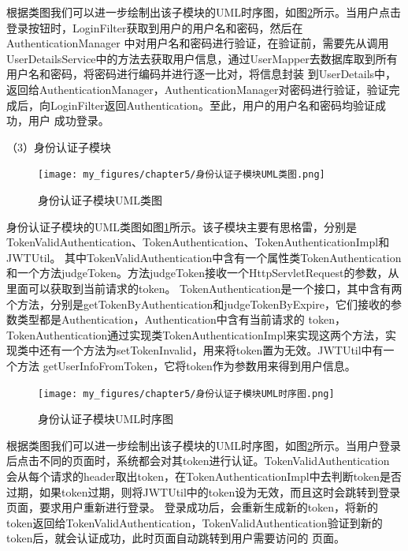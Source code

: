 根据类图我们可以进一步绘制出该子模块的UML时序图，如图\ref{fig:身份认证子模块UML时序图}所示。当用户点击登录按钮时，LoginFilter获取到用户的用户名和密码，然后在AuthenticationManager
中对用户名和密码进行验证，在验证前，需要先从调用UserDetailsService中的方法去获取用户信息，通过UserMapper去数据库取到所有用户名和密码，将密码进行编码并进行逐一比对，将信息封装
到UserDetails中，返回给AuthenticationManager，AuthenticationManager对密码进行验证，验证完成后，向LoginFilter返回Authentication。至此，用户的用户名和密码均验证成功，用户
成功登录。




（3）身份认证子模块

\begin{figure}[htb]
    \centering
    \texttt{[image: my\_figures/chapter5/身份认证子模块UML类图.png]}
    \caption{身份认证子模块UML类图}
    \label{fig:身份认证子模块UML类图}
\end{figure}

身份认证子模块的UML类图如图\ref{fig:身份认证子模块UML类图}所示。该子模块主要有思格雷，分别是TokenValidAuthentication、TokenAuthentication、TokenAuthenticationImpl和JWTUtil。
其中TokenValidAuthentication中含有一个属性类TokenAuthentication和一个方法judgeToken。方法judgeToken接收一个HttpServletRequest的参数，从里面可以获取到当前请求的token。
TokenAuthentication是一个接口，其中含有两个方法，分别是getTokenByAuthentication和judgeTokenByExpire，它们接收的参数类型都是Authentication，Authentication中含有当前请求的
token，TokenAuthentication通过实现类TokenAuthenticationImpl来实现这两个方法，实现类中还有一个方法为setTokenInvalid，用来将token置为无效。JWTUtil中有一个方法
getUserInfoFromToken，它将token作为参数用来得到用户信息。

\begin{figure}[htb]
    \centering
    \texttt{[image: my\_figures/chapter5/身份认证子模块UML时序图.png]}
    \caption{身份认证子模块UML时序图}
    \label{fig:身份认证子模块UML时序图}
\end{figure}

根据类图我们可以进一步绘制出该子模块的UML时序图，如图\ref{fig:身份认证子模块UML时序图}所示。当用户登录后点击不同的页面时，系统都会对其token进行认证。TokenValidAuthentication
会从每个请求的header取出token，在TokenAuthenticationImpl中去判断token是否过期，如果token过期，则将JWTUtil中的token设为无效，而且这时会跳转到登录页面，要求用户重新进行登录。
登录成功后，会重新生成新的token，将新的token返回给TokenValidAuthentication，TokenValidAuthentication验证到新的token后，就会认证成功，此时页面自动跳转到用户需要访问的
页面。




